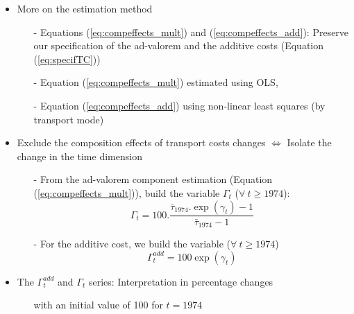 \documentclass[10 pt,Helvetica, french]{beamer}
\begin{document}
\begin{frame}
\begin{itemize}
\item More on the estimation method
\begin{itemize}
\item[-] Equations (\ref{eq:compeffects_mult}) and (\ref{eq:compeffects_add}): Preserve our specification of the ad-valorem and the additive costs (Equation (\ref{eq:specifTC})) \vspace{0.1cm}
\item[-] Equation (\ref{eq:compeffects_mult}) estimated using OLS, \vspace{0.1cm}
\item[-] Equation (\ref{eq:compeffects_add}) using non-linear least squares (by transport mode) \vspace{0.1cm}
\end{itemize}
\item Exclude the composition effects of transport costs changes $\Leftrightarrow$ Isolate the change in the time dimension  \vspace{0.1cm}
\begin{itemize}
\item[-] From the ad-valorem component estimation (Equation (\ref{eq:compeffects_mult})), build the variable $\Gamma_t$ ($\forall~t \geq 1974$):
\begin{equation*}
\Gamma_t = 100.\frac {\bar{\tau}_{1974}.\exp(\gamma_t)-1} {\bar{\tau}_{1974}-1}
\end{equation*}
\item[-] For the additive cost, we build the variable ($\forall~t \geq 1974$)
$$\Gamma^{add}_t = 100 \exp(\gamma_t)$$
\end{itemize}
\item The $\Gamma^{add}_t$ and $\Gamma_t$ series: Interpretation in percentage changes
\begin{itemize}
\item[] with an initial value of 100 for $t=1974$
\end{itemize}


\end{itemize}
 \hyperlink{slide_moreonfig1}{}
\end{frame}
\end{document}
